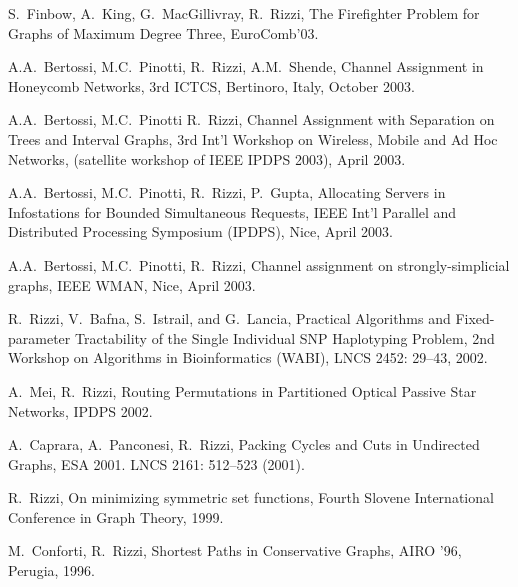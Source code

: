 \begin{etaremune}
\vspace{-1.8mm}
  \item {S.~Finbow, A.~King, G.~MacGillivray, R.~Rizzi},
   \newblock The Firefighter Problem for Graphs of Maximum Degree Three,
   \newblock EuroComb'03.

\vspace{-1.8mm}
  \item {A.A.~Bertossi, M.C.~Pinotti, R.~Rizzi, A.M.~Shende},
   \newblock Channel Assignment in Honeycomb Networks,
   \newblock 3rd ICTCS,
   \newblock Bertinoro, Italy, October 2003.

\vspace{-1.8mm}
  \item {A.A.~Bertossi, M.C.~Pinotti R.~Rizzi},
   \newblock Channel Assignment with Separation on Trees and Interval Graphs,
   \newblock 3rd Int’l Workshop on Wireless, Mobile and Ad Hoc Networks,
   \newblock (satellite workshop of IEEE IPDPS 2003),
   \newblock April 2003.

\vspace{-1.8mm}
  \item {A.A.~Bertossi, M.C.~Pinotti, R.~Rizzi, P.~Gupta},
   \newblock Allocating Servers in Infostations for Bounded Simultaneous Requests,
   \newblock IEEE Int’l Parallel and Distributed Processing Symposium (IPDPS),
   \newblock Nice, April 2003.

\vspace{-1.8mm}
  \item {A.A.~Bertossi, M.C.~Pinotti, R.~Rizzi},
   \newblock Channel assignment on strongly-simplicial graphs,
   \newblock IEEE WMAN,
   \newblock Nice, April 2003.

\vspace{-1.8mm}
  \item {R.~Rizzi, V.~Bafna, S.~Istrail, and G.~Lancia},
   \newblock Practical Algorithms and Fixed-parameter Tractability
   \newblock of the Single Individual SNP Haplotyping Problem,
   \newblock 2nd Workshop on Algorithms in Bioinformatics (WABI),
   \newblock LNCS 2452: 29--43, 2002.

\vspace{-1.8mm}
  \item {A.~Mei, R.~Rizzi},
   \newblock Routing Permutations in Partitioned Optical Passive Star Networks,
   \newblock IPDPS 2002.

\vspace{-1.8mm}
  \item {A.~Caprara, A.~Panconesi, R.~Rizzi},
   \newblock  Packing Cycles and Cuts in Undirected Graphs,
   \newblock ESA 2001.
   \newblock LNCS 2161: 512--523 (2001).

\vspace{-1.8mm}
  \item {R.~Rizzi},
   \newblock On minimizing symmetric set functions,
   \newblock Fourth Slovene International Conference
             in Graph Theory, 1999.

\vspace{-1.8mm}
  \item {M.~Conforti, R.~Rizzi},
   \newblock Shortest Paths in Conservative Graphs,
   \newblock AIRO '96, Perugia, 1996.

\end{etaremune}
